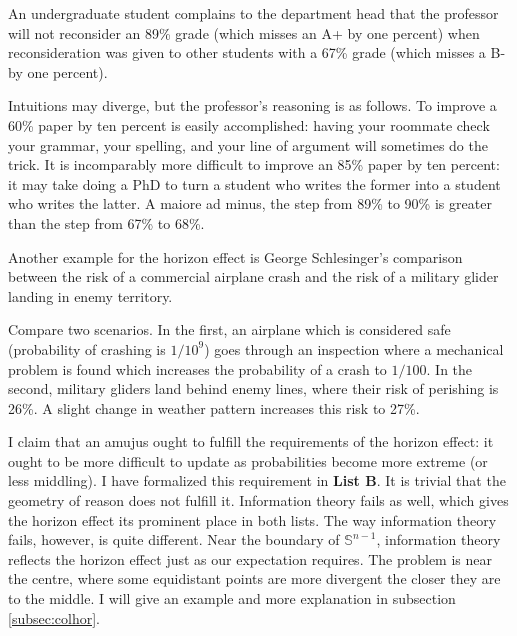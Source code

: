 \documentclass[smallextended]{svjour3}       %
\begin{document}
\begin{quotex}
  \label{ex:complaint} An
  undergraduate student complains to the department head that the
  professor will not reconsider an 89\% grade (which misses an A+ by
  one percent) when reconsideration was given to other students with a
  67\% grade (which misses a B- by one percent).
\end{quotex}

Intuitions may diverge, but the professor's reasoning is as follows.
To improve a 60\% paper by ten percent is easily accomplished: having
your roommate check your grammar, your spelling, and your line of
argument will sometimes do the trick. It is incomparably more
difficult to improve an 85\% paper by ten percent: it may take doing a
PhD to turn a student who writes the former into a student who writes
the latter. A maiore ad minus, the step from 89\% to 90\% is greater
than the step from 67\% to 68\%.

Another example for the horizon effect is George Schlesinger's
comparison between the risk of a commercial airplane crash and the
risk of a military glider landing in enemy territory.

\begin{quotex}
  \label{ex:schlesinger} Compare two
  scenarios. In the first, an airplane which is considered safe
  (probability of crashing is $1/10^{9}$) goes through an
  inspection where a mechanical problem is found which increases
  the probability of a crash to $1/100$. In the second, military
  gliders land behind enemy lines, where their risk of perishing
  is 26\%. A slight change in weather pattern increases this risk
  to 27\%. 
\end{quotex}

I claim that an amujus ought to fulfill the requirements of the
horizon effect: it ought to be more difficult to update as
probabilities become more extreme (or less middling). I have
formalized this requirement in \textbf{List B}. It is trivial that the
geometry of reason does not fulfill it. Information theory fails as
well, which gives the horizon effect its prominent place in both
lists. The way information theory fails, however, is quite different.
Near the boundary of $\mathbb{S}^{n-1}$, information theory reflects
the horizon effect just as our expectation requires. The problem is
near the centre, where some equidistant points are more divergent the
closer they are to the middle. I will give an example and more
explanation in subsection \ref{subsec:colhor}.
\end{document}
